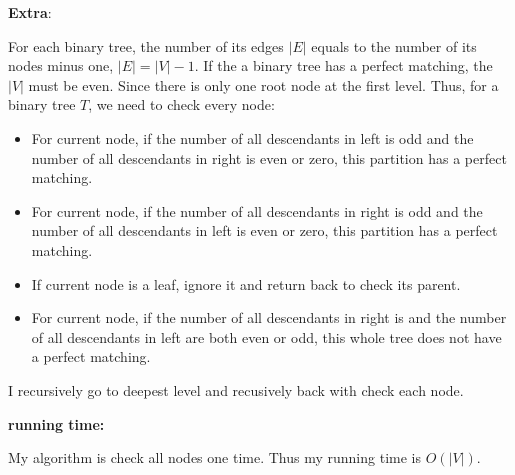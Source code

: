 \documentclass[12pt]{article}
\begin{document}
\pagebreak
\large \textbf{Extra}:\\ \vspace{5mm}\par
\normalsize 
\setlength{\baselineskip}{8mm}
For each binary tree, the number of its edges $|E|$ equals to the number of its nodes minus one, $|E| = |V| - 1$. 
If the a binary tree has a perfect matching, the $|V|$ must be even. 
Since there is only one root node at the first level.
Thus, for a binary tree $T$, we need to check every node:
\begin{itemize}
\item For current node, if the number of all descendants in left is odd and the number of all descendants in right is even or zero, this partition has a perfect matching. 
\item For current node, if the number of all descendants in right is odd and the number of all descendants in left is even or zero, this partition has a perfect matching. 
\item If current node is a leaf, ignore it and return back to check its parent.
\item For current node, if the number of all descendants in right is and the number of all descendants in left are both even or odd, this whole tree does not have a perfect matching. 
\end{itemize}
I recursively go to deepest level and recusively back with check each node.

\textbf{running time:} \par
My algorithm is check all nodes one time. Thus my running time is $O(|V|)$.
\end{document}
